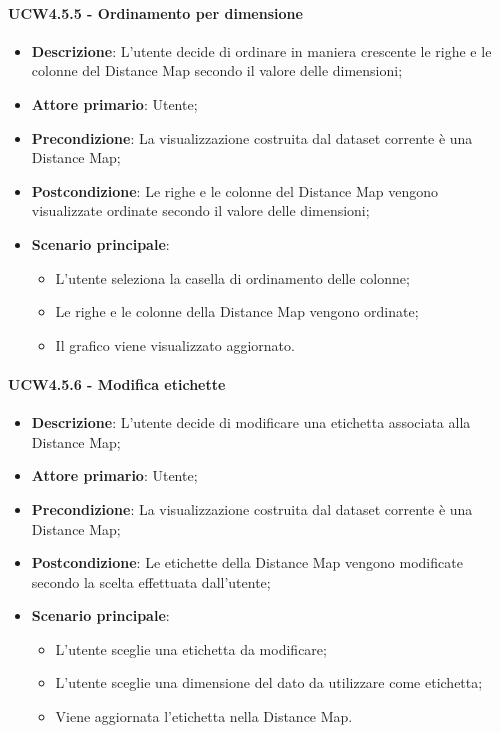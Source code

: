 \paragraph{UCW4.5.5 - Ordinamento per dimensione}
\label{par:ucw4.5.5}
\begin{itemize}
    \item \textbf{Descrizione}: L'utente decide di ordinare in maniera crescente le righe e le colonne del Distance Map secondo il valore delle dimensioni;
    \item \textbf{Attore primario}: Utente;
    \item \textbf{Precondizione}: La visualizzazione costruita dal dataset corrente è una Distance Map;
    \item \textbf{Postcondizione}: Le righe e le colonne del Distance Map vengono visualizzate ordinate secondo il valore delle dimensioni;
    \item \textbf{Scenario principale}:
    \begin{itemize}
        \item L'utente seleziona la casella di ordinamento delle colonne;
        \item Le righe e le colonne della Distance Map vengono ordinate;
        \item Il grafico viene visualizzato aggiornato.
    \end{itemize}
\end{itemize}


\paragraph{UCW4.5.6 - Modifica etichette}
\label{par:ucw4.5.6}
\begin{itemize}
    \item \textbf{Descrizione}: L'utente decide di modificare una etichetta associata alla Distance Map;
    \item \textbf{Attore primario}: Utente;
    \item \textbf{Precondizione}: La visualizzazione costruita dal dataset corrente è una Distance Map;
    \item \textbf{Postcondizione}: Le etichette della Distance Map vengono modificate secondo la scelta effettuata dall'utente;
    \item \textbf{Scenario principale}:
    \begin{itemize}
        \item L'utente sceglie una etichetta da modificare;
        \item L'utente sceglie una dimensione del dato da utilizzare come etichetta;
        \item Viene aggiornata l'etichetta nella Distance Map.
    \end{itemize}
\end{itemize}



